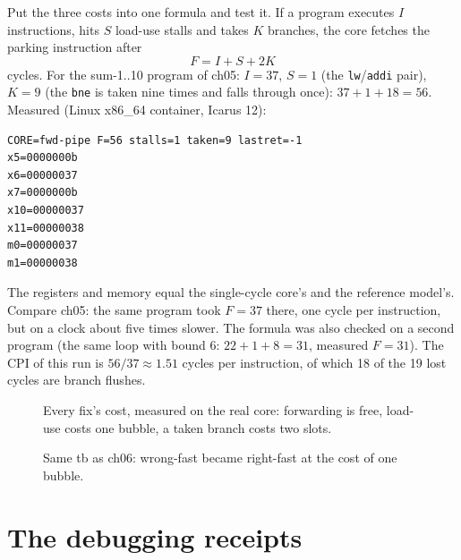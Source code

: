 \begin{example}\label{ex:score07}
Put the three costs into one formula and test it. If a program executes
$I$ instructions, hits $S$ load-use stalls and takes $K$ branches, the
core fetches the parking instruction after
\[
F = I + S + 2K
\]
cycles. For the sum-1..10 program of ch05: $I=37$, $S=1$ (the
\texttt{lw}/\texttt{addi} pair), $K=9$ (the \texttt{bne} is taken nine
times and falls through once): $37+1+18=56$. Measured (Linux x86\_64
container, Icarus 12):
\begin{lstlisting}
CORE=fwd-pipe F=56 stalls=1 taken=9 lastret=-1
x5=0000000b
x6=00000037
x7=0000000b
x10=00000037
x11=00000038
m0=00000037
m1=00000038
\end{lstlisting}
The registers and memory equal the single-cycle core's and the
reference model's. Compare ch05: the same program took $F=37$ there,
one cycle per instruction, but on a clock about five times slower. The
formula was also checked on a second program (the same loop with bound
6: $22+1+8=31$, measured $F=31$). The CPI of this run is
$56/37\approx1.51$ cycles per instruction, of which 18 of the 19 lost
cycles are branch flushes.
\end{example}
\begin{figure}[h]
\centering

\caption[Hazard scoreboard]{Every fix's cost, measured on the
real core: forwarding is free, load-use costs one bubble, a taken
branch costs two slots.}
\label{fig:score07}
\end{figure}

\begin{figure}[t]
\centering

\caption[Before/after]{Same tb as ch06: wrong-fast became
right-fast at the cost of one bubble.}
\label{fig:cpiafter07}
\end{figure}

\section{The debugging receipts}
\label{sec:receipts07}

